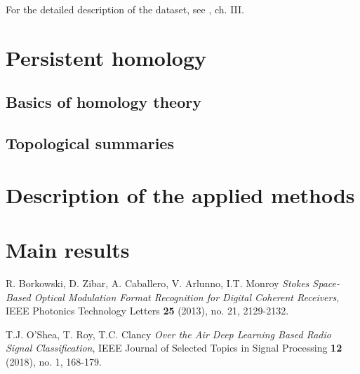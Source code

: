 \documentclass[12pt]{article}
\theoremstyle{plain}
\theoremstyle{definition}
\theoremstyle{remark}
\begin{document}
	For the detailed description of the dataset, see \cite{ORC}, ch. III.
	
	\section{Persistent homology}
	
	\subsection{Basics of homology theory}
	
	\subsection{Topological summaries}
	
	\section{Description of the applied methods}
	
	\section{Main results}
	
	\begin{thebibliography}{10}
		
		R. Borkowski, D. Zibar, A. Caballero, V. Arlunno, I.T. Monroy \emph{Stokes Space-Based Optical Modulation Format Recognition for Digital Coherent Receivers}, IEEE Photonics Technology Letters {\bf 25} (2013), no. 21, 2129-2132.
		
		T.J. O'Shea, T. Roy, T.C. Clancy \emph{Over the Air Deep Learning Based Radio Signal Classification}, IEEE Journal of Selected Topics in Signal Processing {\bf 12} (2018), no. 1, 168-179.
		
	\end{thebibliography}
	
	
	
\end{document}
